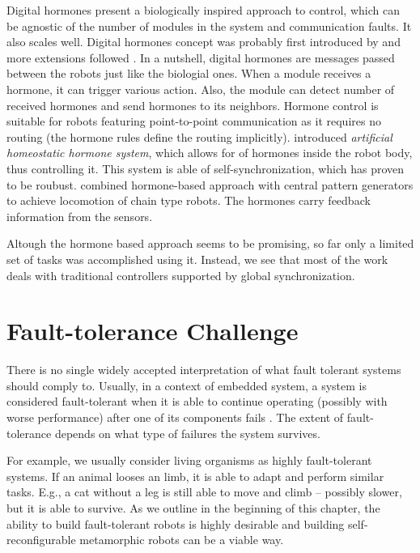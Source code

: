 Digital hormones present a biologically inspired approach to control, which can
be agnostic of the number of modules in the system and communication faults. It
also scales well. Digital hormones concept was probably first introduced by
\textcite{DBLP:conf/agents/ShenLW00} and more extensions followed
\cite{DBLP:conf/icra/SalemiSW01, DBLP:journals/trob/ShenSW02}. In a nutshell,
digital hormones are messages passed between the robots just like the biologial
ones. When a module receives a hormone, it can trigger various action. Also, the
module can detect number of received hormones and send hormones to its
neighbors. Hormone control is suitable for robots featuring point-to-point
communication as it requires no routing (the hormone rules define the routing
implicitly). \textcite{DBLP:conf/cec/HamannSSC10} introduced \emph{artificial
homeostatic hormone system}, which allows for  of hormones inside
the robot body, thus controlling it. This system is able of
self-synchronization, which has proven to be roubust.
\textcite{DBLP:conf/icra/MorenoG11} combined hormone-based approach with central
pattern generators to achieve locomotion of chain type robots. The hormones
carry feedback information from the sensors.

Altough the hormone based approach seems to be promising, so far only a limited
set of tasks was accomplished using it. Instead, we see that most of the work
deals with traditional controllers supported by global synchronization.

\section{Fault-tolerance Challenge}

There is no single widely accepted interpretation of what fault tolerant systems
should comply to. Usually, in a context of embedded system, a system is
considered fault-tolerant when it is able to continue operating (possibly with
worse performance) after one of its components fails
\cite{DBLP:journals/micro/Johnson84}. The extent of fault-tolerance depends on
what type of failures the system survives.

For example, we usually consider living organisms as highly fault-tolerant
systems. If an animal looses an limb, it is able to adapt and perform similar
tasks. E.g., a cat without a leg is still able to move and climb -- possibly
slower, but it is able to survive. As we outline in the beginning of this
chapter, the ability to build fault-tolerant robots is highly desirable and
building self-reconfigurable metamorphic robots can be a viable way.

